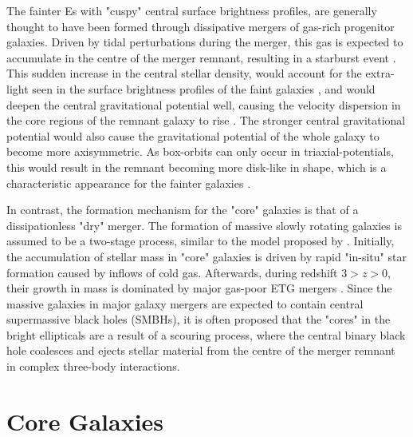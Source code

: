 \documentclass[english, twoside]{HYgradu}
\begin{document}
The fainter Es with "cuspy" central surface brightness profiles, are generally thought to have been formed through dissipative mergers of gas-rich progenitor galaxies. Driven by tidal perturbations during the merger, this gas is expected to accumulate in the centre of the merger remnant, resulting in a starburst event \citep{Barnes1991}. This sudden increase in the central stellar density, would account for the extra-light seen in the surface brightness profiles of the faint galaxies \citep{Hopkins2008}, and would deepen the central gravitational potential well, causing the velocity dispersion in the core regions of the remnant galaxy to rise \citep{Barnes1996}. The stronger central gravitational potential would also cause the gravitational potential of the whole galaxy to become more axisymmetric. As box-orbits can only occur in triaxial-potentials, this would result in the remnant becoming more disk-like in shape, which is a characteristic appearance for the fainter galaxies \citep{Naab2006}.

In contrast, the formation mechanism for the "core" galaxies is that of a dissipationless "dry" merger. The formation of massive slowly rotating galaxies is assumed to be a two-stage process, similar to the model proposed by \cite{Oser2010}. Initially, the accumulation of stellar mass in "core" galaxies is driven by rapid "in-situ" star formation caused by inflows of cold gas. Afterwards, during redshift $3 > z > 0$, their growth in mass is dominated by major gas-poor ETG mergers \citep{Naab2009}. Since the massive galaxies in major galaxy mergers are expected to contain central supermassive black holes (SMBHs), it is often proposed that the "cores" in the bright ellipticals are a result of a scouring process, where the central binary black hole coalesces and ejects stellar material from the centre of the merger remnant in complex three-body interactions.

\section{Core Galaxies} \label{section:core_galaxies}
\end{document}

